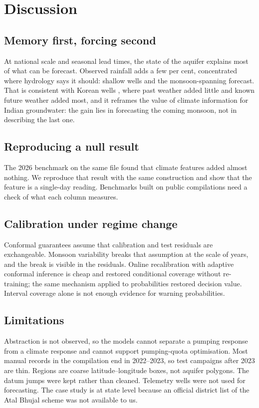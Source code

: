 \documentclass[hess, manuscript]{copernicus}
\begin{document}
\section{Discussion}

\subsection{Memory first, forcing second}
At national scale and seasonal lead times, the state of the aquifer explains most of
what can be forecast. Observed rainfall adds a few per cent, concentrated where hydrology says it should: shallow wells and the
monsoon-spanning forecast. That is consistent with Korean wells \citep{kim2026sources}, where past weather added little and
known future weather added most, and it reframes the value of climate information for Indian groundwater: the gain lies in
forecasting the coming monsoon, not in describing the last one.

\subsection{Reproducing a null result}
The 2026 benchmark on the same file found that climate features added almost nothing. We
reproduce that result with the same construction and show that the feature is a single-day reading. Benchmarks built on public
compilations need a check of what each column measures.

\subsection{Calibration under regime change}
Conformal guarantees assume that calibration and test residuals are exchangeable.
Monsoon variability breaks that assumption at the scale of years, and the break is visible in the residuals. Online
recalibration with adaptive conformal inference is cheap and restored conditional coverage without re-training; the same
mechanism applied to probabilities restored decision value. Interval coverage alone is not enough evidence for warning
probabilities.

\subsection{Limitations}
Abstraction is not observed, so the models cannot separate a pumping response from a climate response
and cannot support pumping-quota optimisation. Most manual records in the compilation end in 2022--2023, so test campaigns after
2023 are thin. Regions are coarse latitude--longitude boxes, not aquifer polygons. The datum jumps were kept rather than cleaned.
Telemetry wells were not used for forecasting. The case study is at state level because an official district list of the Atal
Bhujal scheme was not available to us.
\end{document}
